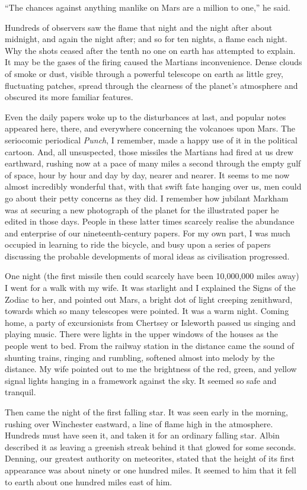 ``The chances against anything manlike on Mars are a million to
one,'' he said.

Hundreds of observers saw the flame that night and the night after
about midnight, and again the night after; and so for ten nights, a
flame each night. Why the shots ceased after the tenth no one on
earth has attempted to explain. It may be the gases of the firing
caused the Martians inconvenience. Dense clouds of smoke or dust,
visible through a powerful telescope on earth as little grey,
fluctuating patches, spread through the clearness of the planet's
atmosphere and obscured its more familiar features.

Even the daily papers woke up to the disturbances at last, and
popular notes appeared here, there, and everywhere concerning the
volcanoes upon Mars. The seriocomic periodical \emph{Punch}, I
remember, made a happy use of it in the political cartoon. And, all
unsuspected, those missiles the Martians had fired at us drew
earthward, rushing now at a pace of many miles a second through the
empty gulf of space, hour by hour and day by day, nearer and
nearer. It seems to me now almost incredibly wonderful that, with
that swift fate hanging over us, men could go about their petty
concerns as they did. I remember how jubilant Markham was at
securing a new photograph of the planet for the illustrated paper
he edited in those days. People in these latter times scarcely
realise the abundance and enterprise of our nineteenth-century
papers. For my own part, I was much occupied in learning to ride
the bicycle, and busy upon a series of papers discussing the
probable developments of moral ideas as civilisation progressed.

One night (the first missile then could scarcely have been
10,000,000 miles away) I went for a walk with my wife. It was
starlight and I explained the Signs of the Zodiac to her, and
pointed out Mars, a bright dot of light creeping zenithward,
towards which so many telescopes were pointed. It was a warm night.
Coming home, a party of excursionists from Chertsey or Isleworth
passed us singing and playing music. There were lights in the upper
windows of the houses as the people went to bed. From the railway
station in the distance came the sound of shunting trains, ringing
and rumbling, softened almost into melody by the distance. My wife
pointed out to me the brightness of the red, green, and yellow
signal lights hanging in a framework against the sky. It seemed so
safe and tranquil.

Then came the night of the first falling star. It was seen early in
the morning, rushing over Winchester eastward, a line of flame high
in the atmosphere. Hundreds must have seen it, and taken it for an
ordinary falling star. Albin described it as leaving a greenish
streak behind it that glowed for some seconds. Denning, our
greatest authority on meteorites, stated that the height of its
first appearance was about ninety or one hundred miles. It seemed
to him that it fell to earth about one hundred miles east of him.

